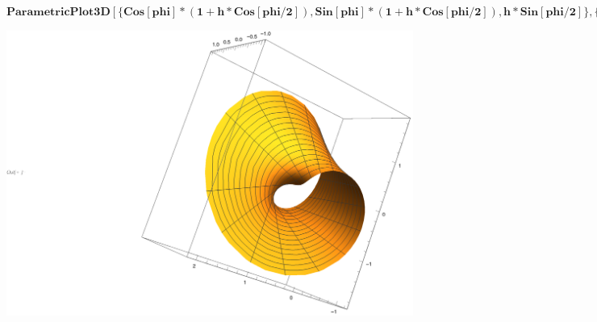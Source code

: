 \documentclass{article}
\begin{document}
\begin{doublespace}
\noindent\(\pmb{\text{ParametricPlot3D}[\{\text{Cos}[\text{phi}]*(1+h*\text{Cos}[\text{phi}/2]), \text{Sin}[\text{phi}]*(1+h*\text{Cos}[\text{phi}/2]),
h*\text{Sin}[\text{phi}/2]\},\{\text{phi}, 0, 2*\text{Pi}\},\{h,-1,1\}]}\)
\end{doublespace}

\includegraphics{Untitled-1_gr1.eps}
\end{document}
